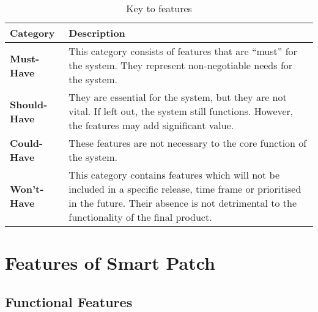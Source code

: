     \begin{table}[h]
        \centering
        \begin{tabularx}{\textwidth}{|p{3cm}|X|}
            \hline
             \textbf{Category} 
             & \textbf{Description} \\ \hline

             \textbf{Must-Have} 
             & This category consists of features that are “must” for the system. They represent non-negotiable needs for the system.  
             \\ \hline

             \textbf{Should-Have} 
             & 	They are essential for the system, but they are not vital. If left out, the system still functions. However, the features  may add significant value. 
             \\ \hline

             \textbf{Could-Have} 
             & These features are not necessary to the core function of the system. 
             \\ \hline

             \textbf{Won't-Have} 
             & This category contains features which will not be included in a specific release, time frame or prioritised in the future. Their absence is not detrimental to the functionality of the final product.
             \\ \hline

             
        \end{tabularx}
        \caption{Key to features}
        \label{tab:key-to-features}
    \end{table}


\section{Features of Smart Patch}
\subsection{Functional Features}

